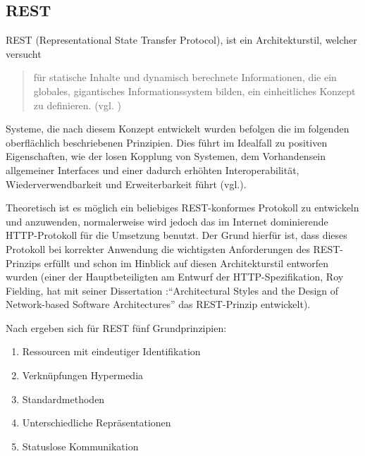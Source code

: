 \subsection{REST}\label{section:rest}
REST (Representational State Transfer Protocol), ist ein Architekturstil, welcher versucht 
\begin{quotation}
für statische Inhalte und dynamisch berechnete Informationen, die ein globales, gigantisches Informationssystem bilden, ein einheitliches Konzept zu definieren. (vgl. \cite{tilkovrestchapter2})
\end{quotation}
Systeme, die nach diesem Konzept entwickelt wurden befolgen die im folgenden oberflächlich beschriebenen Prinzipien. Dies führt im Idealfall zu positiven Eigenschaften, wie der losen Kopplung von Systemen, dem Vorhandensein allgemeiner Interfaces und einer dadurch erhöhten Interoperabilität, Wiederverwendbarkeit und Erweiterbarkeit führt (vgl.\cite{tilkovrestchapter2}).

Theoretisch ist es möglich ein beliebiges REST-konformes Protokoll zu entwickeln und anzuwenden, normalerweise wird jedoch das im Internet dominierende HTTP-Protokoll für die Umsetzung benutzt. Der Grund hierfür ist, dass dieses Protokoll bei korrekter Anwendung die wichtigsten Anforderungen des REST-Prinzips erfüllt und schon im Hinblick auf diesen Architekturstil entworfen wurden (einer der Hauptbeteiligten am Entwurf der HTTP-Spezifikation, Roy Fielding, hat mit seiner Dissertation :"`Architectural Styles and the Design of Network-based Software Architectures"' das REST-Prinzip entwickelt). 

Nach \cite{tilkovrestchapter2} ergeben sich für REST fünf Grundprinzipien:
\begin{enumerate}
 \item\label{enumerate_rest_principles:1} Ressourcen mit eindeutiger Identifikation
 \item\label{enumerate_rest_principles:2} Verknüpfungen Hypermedia
 \item\label{enumerate_rest_principles:3} Standardmethoden
 \item\label{enumerate_rest_principles:4} Unterschiedliche Repräsentationen
 \item\label{enumerate_rest_principles:5} Statuslose Kommunikation
\end{enumerate}


